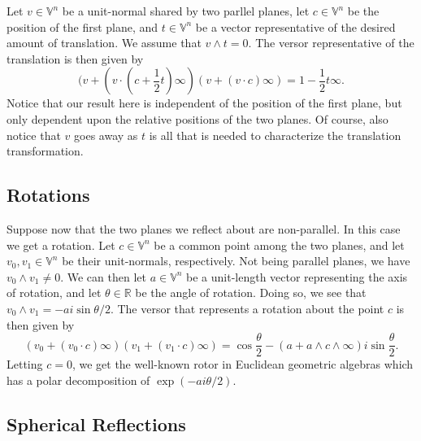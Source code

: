 \documentclass[12pt]{article}
\newcommand{\V}{\mathbb{V}}
\newcommand{\R}{\mathbb{R}}
\newcommand{\nvai}{\infty}
\begin{document}
Let $v\in\V^n$ be a unit-normal shared by two parllel planes, let
$c\in\V^n$ be the position of the first plane, and $t\in\V^n$
be a vector representative of the desired amount of translation.
We assume that $v\wedge t=0$.
The versor representative of the translation is then given by
\begin{equation*}
(v+(v\cdot(c+\frac{1}{2}t)\nvai)(v+(v\cdot c)\nvai) = 1 - \frac{1}{2}t\nvai.
\end{equation*}
Notice that our result here is independent of the position of the
first plane, but only dependent upon the relative positions of
the two planes.
Of course, also notice that $v$ goes away as $t$ is all that
is needed to characterize the translation transformation.


\subsection{Rotations}

Suppose now that the two planes we reflect about are
non-parallel.  In this case we get a rotation.  Let $c\in\V^n$
be a common point among the two planes, and let $v_0,v_1\in\V^n$
be their unit-normals, respectively.  Not being parallel planes,
we have $v_0\wedge v_1\neq 0$.  We can then let $a\in\V^n$
be a unit-length vector representing the axis of rotation, and
let $\theta\in\R$ be the angle of rotation.  Doing so, we see
that $v_0\wedge v_1=-ai\sin\theta/2$.  The versor that
represents a rotation about the point $c$ is then given by
\begin{equation*}
(v_0+(v_0\cdot c)\nvai)(v_1+(v_1\cdot c)\nvai) = \cos\frac{\theta}{2} - (a+a\wedge c\wedge\nvai)i\sin\frac{\theta}{2}.
\end{equation*}
Letting $c=0$, we get the well-known rotor in Euclidean geometric algebras which
has a polar decomposition of $\exp(-ai\theta/2)$.


\subsection{Spherical Reflections}\label{sec_spherical_reflections}
\end{document}
